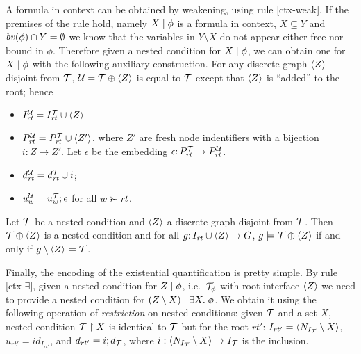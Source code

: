 A formula in context can be obtained by weakening, using rule [ctx-weak]. If the premises of the rule hold, namely ${X} \mid {\phi}$ is a formula in context, $X\subseteq Y$ and $\mathit{bv}(\phi) \cap Y = \emptyset$ we know that the variables in $Y \setminus X$ do not appear either free nor bound in $\phi$. Therefore given a {\proper} nested condition for ${X} \mid {\phi}$, we can obtain one for ${X} \mid {\phi}$ with the following auxiliary construction. For any discrete graph $\langle Z\rangle$ disjoint from ${\mathcal{T}}$, ${\mathcal{U}}={\mathcal{T}}\oplus \langle Z\rangle$ is equal to ${\mathcal{T}}$ except that $\langle Z\rangle$ is ``added'' to the root; hence
\begin{itemize}
\item $I^{\mathcal{U}}_{\mathit{rt}}=I^{\mathcal{T}}_{\mathit{rt}}\cup \langle Z\rangle$ 
\item $P^{\mathcal{U}}_{\mathit{rt}}=P^{\mathcal{T}}_{\mathit{rt}}\cup \langle Z'\rangle$, where $Z'$ are fresh node indentifiers with a bijection $i : Z \to Z'$. Let  $\epsilon$ be the embedding $ \epsilon {:}\, P^{\mathcal{T}}_{\mathit{rt}}\rightarrow P^{\mathcal{U}}_{\mathit{rt}}$. 
\item $d^{\mathcal{U}}_{\mathit{rt}}=d^{\mathcal{T}}_{\mathit{rt}}\cup i$;
\item $u^{\mathcal{U}}_w=u^{\mathcal{T}}_w;\epsilon$ for all $w\childof \rt$. 
\end{itemize}

\begin{proposition}
\label{pr:weakening satisfaction}
Let ${\mathcal{T}}$ be a {\proper} nested condition and $\langle Z\rangle$ a discrete graph disjoint from ${\mathcal{T}}$. Then ${\mathcal{T}} \oplus \langle Z\rangle$ is a {\proper} nested condition and for all $g{:}\, I_{\mathit{rt}}\cup \langle Z\rangle\rightarrow G$, $g\models {\mathcal{T}}\oplus \langle Z\rangle$ if and only if $g\setminus \langle Z\rangle \models{\mathcal{T}}$.
\end{proposition}

Finally, the encoding of the existential quantification is pretty simple. By rule [ctx-$\exists$], given a nested condition for ${Z} \mid {\phi}$, i.e.\ ${\mathcal{T}}_\phi$ with root interface $\langle Z\rangle$ we need to provide a nested condition for  ${(Z\setminus X)} \mid {\exists X .\;\phi}$. We obtain it using the following operation of \emph{restriction} on nested conditions: given ${\mathcal{T}}$ and a set $X$, nested condition ${\mathcal{T}}\restriction X$ is identical to ${\mathcal{T}}$ but for the root $rt'$: $I_{rt'} = \langle N_{I_{\mathcal{T}}}\setminus X\rangle$, $u_{rt'} = id_{I_{rt'}}$, and $d_{rt'} = i ; d_{\mathcal{T}}$, where $i: \langle N_{I_{\mathcal{T}}}\setminus X\rangle \rightarrow I_{\mathcal{T}}$ is the inclusion. 

